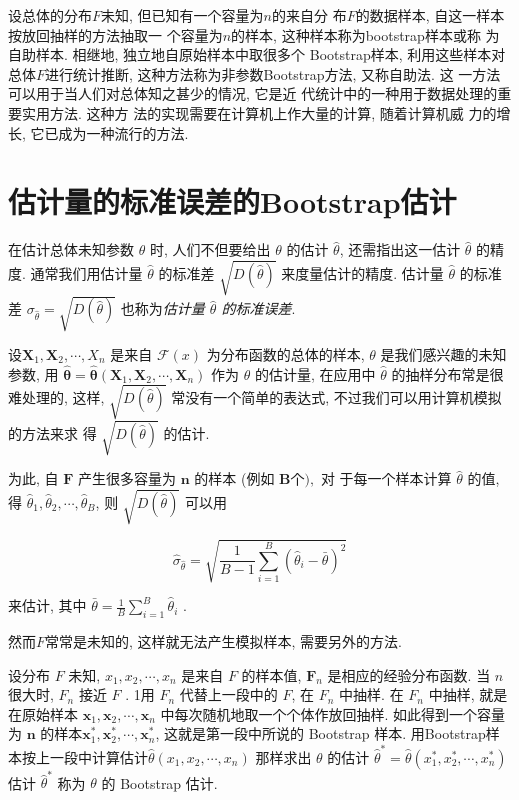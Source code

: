设总体的分布$F$未知, 但已知有一个容量为$n$的来自分
布$F$的数据样本, 自这一样本按放回抽样的方法抽取一
个容量为$n$的样本, 这种样本称为bootstrap样本或称
为自助样本. 相继地, 独立地自原始样本中取很多个
Bootstrap样本, 利用这些样本对总体$F$进行统计推断, 
这种方法称为非参数Bootstrap方法, 又称自助法. 这
一方法可以用于当人们对总体知之甚少的情况, 它是近
代统计中的一种用于数据处理的重要实用方法. 这种方
法的实现需要在计算机上作大量的计算, 随着计算机威
力的增长, 它已成为一种流行的方法. 

\section{估计量的标准误差的Bootstrap估计}

在估计总体未知参数 $ \theta $ 时, 人们不但要给出 $ \theta $ 的估计 $ \hat{\theta} $, 还需指出这一估计 $ \hat{\theta} $ 的精度. 通常我们用估计量 $ \hat{\theta} $
的标准差 $ \sqrt{D(\hat{\theta})} $ 来度量估计的精度. 估计量 $ \hat{\theta} $ 的标准差 $ \sigma_{\hat{\theta}}=\sqrt{D(\hat{\theta})} $ 也称为\textit{估计量 $ \hat{\theta} $ 的标准误差}. 

设$ \boldsymbol{X}_{1}, \boldsymbol{X}_{2}, \cdots, X_{n} $ 是来自 $ \mathcal{F}(x) $ 为分布函数的总体的样本, $ \theta $ 是我们感兴趣的未知参数, 用 $ \hat{\boldsymbol{\theta}}=\hat{\boldsymbol{\theta}}\left(\boldsymbol{X}_{1}, \boldsymbol{X}_{2}, \cdots, \boldsymbol{X}_{n}\right) $ 作为 $ \theta $ 的估计量, 在应用中 $ \hat{\theta} $ 的抽样分布常是很难处理的, 这样, $ \sqrt{D(\hat{\theta})} $ 常没有一个简单的表达式, 不过我们可以用计算机模拟的方法来求 得 $ \sqrt{D(\hat{\theta})} $ 的估计. 

为此, 自 $ \boldsymbol{F} $ 产生很多容量为 $ \boldsymbol{n} $ 的样本 (例如 $ \boldsymbol{B 个 ) ,} $ 对 于每一个样本计算 $ \hat{\theta} $ 的值, 得 $ \hat{\theta}_{1}, \hat{\theta}_{2}, \cdots, \hat{\theta}_{B} $, 则 $ \sqrt{D(\hat{\theta})} $ 可以用

$$ \hat{\sigma}_{\hat{\theta}}=\sqrt{\frac{1}{B-1} \sum_{i=1}^{B}\left(\hat{\theta}_{i}-\bar{\theta}\right)^{2}} $$

来估计, 其中 $ \bar{\theta}=\frac{1}{B} \sum_{i=1}^{B} \hat{\theta}_{i} $ . 

然而$F$常常是未知的, 这样就无法产生模拟样本, 需要另外的方法. 

设分布 $ F $ 未知, $ x_{1}, x_{2}, \cdots, x_{n} $ 是来自 $ F $ 的样本值, $ \boldsymbol{F}_{n} $ 是相应的经验分布函数. 当 $ n $ 很大时, $ F_{n} $ 接近 $ F $ . 1用 $ F_{n} $ 代替上一段中的 $ F $, 在 $ F_{n} $ 中抽样. 在 $ F_{n} $ 中抽样, 就是在原始样本 $ \boldsymbol{x}_{1}, \boldsymbol{x}_{2}, \cdots, \boldsymbol{x}_{n} $ 中每次随机地取一个个体作放回抽样. 如此得到一个容量为 $ \boldsymbol{n} $ 的样本$ \boldsymbol{x}_{1}^{*}, \boldsymbol{x}_{2}^{*}, \cdots, \boldsymbol{x}_{n}^{*} $, 这就是第一段中所说的 Bootstrap 样本. 用Bootstrap样本按上一段中计算估计$ \hat{\theta}\left(x_{1}, x_{2}, \cdots, x_{n}\right) $ 那样求出 $ \theta $ 的估计 $ \hat{\theta}^{*}=\hat{\theta}\left(x_{1}^{*}, x_{2}^{*}, \cdots, x_{n}^{*}\right) $估计 $ \hat{\theta}^{*} $ 称为 $ \theta $ 的 Bootstrap 估计. 



